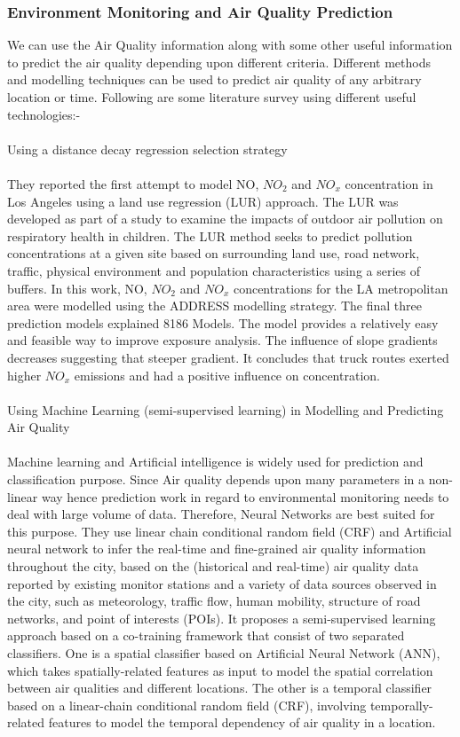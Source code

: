 \subsubsection{Environment Monitoring and Air Quality Prediction}
We can use the Air Quality information along with some other useful information to predict the air quality depending upon different criteria. Different methods and modelling techniques can be used to predict air quality of any arbitrary location or time. Following are some literature survey using different useful technologies:-
\\
\\
Using a distance decay regression selection strategy
\\
\\
They reported the first attempt to model NO, $NO_2$ and $NO_x$ concentration in Los Angeles using a land use regression (LUR) approach. The LUR was developed as part of a study to examine the impacts of outdoor air pollution on respiratory health in children. The LUR method seeks to predict pollution concentrations at a given site based on surrounding land use, road network, traffic, physical environment and population characteristics using a series of buffers. In this work, NO, $NO_2$ and $NO_x$ concentrations for the LA metropolitan area were modelled using the ADDRESS modelling strategy. The final three prediction models explained 8186 Models. The model provides a relatively easy and feasible way to improve exposure analysis. The influence of slope gradients decreases suggesting that steeper gradient. It concludes that truck routes exerted higher $NO_x$ emissions and had a positive influence on concentration.
\\
\\
Using Machine Learning (semi-supervised learning) in Modelling and Predicting Air Quality
\\
\\
Machine learning and Artificial intelligence is widely used for prediction and classification purpose. Since Air quality depends upon many parameters in a non-linear way hence prediction work in regard to environmental monitoring needs to deal with large volume of data. Therefore, Neural Networks are best suited for this purpose. They use linear chain conditional random field (CRF) and Artificial neural network to infer the real-time and fine-grained air quality information throughout the city, based on the (historical and real-time) air quality data reported by existing monitor stations and a variety of data sources observed in the city, such as meteorology, traffic flow, human mobility, structure of road networks, and point of interests (POIs). It proposes a semi-supervised learning approach based on a co-training framework that consist of two separated classifiers. One is a spatial classifier based on Artificial Neural Network (ANN), which takes spatially-related features as input to model the spatial correlation between air qualities and different locations. The other is a temporal classifier based on a linear-chain conditional random field (CRF), involving temporally-related features to model the temporal dependency of air quality in a location.
